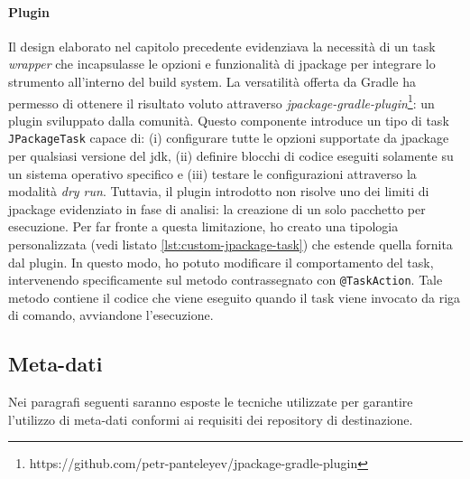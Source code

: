 \paragraph{Plugin} Il design elaborato nel capitolo precedente evidenziava la necessità di un task \textit{wrapper} che incapsulasse le opzioni e funzionalità di jpackage per integrare lo strumento all'interno del build system. La versatilità offerta da Gradle ha permesso di ottenere il risultato voluto attraverso \textit{jpackage-gradle-plugin}\footnote{https://github.com/petr-panteleyev/jpackage-gradle-plugin}: un plugin sviluppato dalla comunità. Questo componente introduce un tipo di task \texttt{JPackageTask} capace di: (i) configurare tutte le opzioni supportate da jpackage per qualsiasi versione del \ac{jdk}, (ii) definire blocchi di codice eseguiti solamente su un sistema operativo specifico e (iii) testare le configurazioni attraverso la modalità \textit{dry run}. Tuttavia, il plugin introdotto non risolve uno dei limiti di jpackage evidenziato in fase di analisi: la creazione di un solo pacchetto per esecuzione. Per far fronte a questa limitazione, ho creato una tipologia personalizzata (vedi listato \ref{lst:custom-jpackage-task}) che estende quella fornita dal plugin. In questo modo, ho potuto modificare il comportamento del task, intervenendo specificamente sul metodo contrassegnato con \texttt{@TaskAction}. Tale metodo contiene il codice che viene eseguito quando il task viene invocato da riga di comando, avviandone l'esecuzione.



\subsection{Meta-dati}

Nei paragrafi seguenti saranno esposte le tecniche utilizzate per garantire l'utilizzo di meta-dati conformi ai requisiti dei repository di destinazione.

